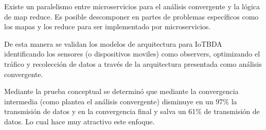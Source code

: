 Existe un paralelismo entre microservicios para el análisis convergente y la lógica de map reduce. Es posible descomponer en partes de problemas específicos como los mapas y los reduce para ser implementado por microservicios. 

De esta manera se validan los modelos de arquitectura para IoTBDA identificando los sensores (o dispositivos moviles) como observers, optimizando el tráfico y recolección de datos a través de la arquitectura presentada como análisis convergente.

Mediante la prueba conceptual se determinó que mediante la convergencia intermedia (como plantea el análisis convergente)  disminuye en un 97\% la transmisión de datos y en la convergencia final y salva un 61\% de transmisión de datos. Lo cual hace muy atractivo este enfoque. 
